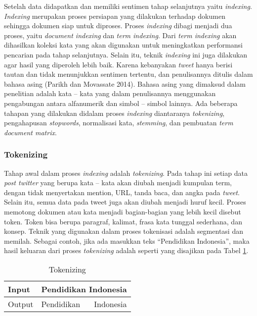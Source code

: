 Setelah data didapatkan dan memiliki sentimen tahap selanjutnya yaitu \textit{indexing}. \textit{Indexing} merupakan proses persiapan yang dilakukan terhadap dokumen sehingga dokumen siap untuk diproses. Proses \textit{indexing} dibagi menjadi dua proses, yaitu \textit{document indexing} dan \textit{term indexing}. Dari \textit{term indexing} akan dihasilkan koleksi kata yang akan digunakan untuk meningkatkan performansi pencarian pada tahap selanjutnya. Selain itu, teknik \textit{indexing} ini juga dilakukan agar hasil yang diperoleh lebih baik. Karena kebanyakan \textit{tweet} hanya berisi tautan dan tidak menunjukkan sentimen tertentu, dan penulisannya ditulis dalam bahasa asing (Parikh dan Movassate 2014). Bahasa asing yang dimaksud dalam penelitian adalah kata – kata yang dalam penulisannya menggunakan pengabungan antara alfanumerik dan simbol – simbol lainnya. Ada beberapa tahapan  yang dilakukan didalam proses \textit{indexing} diantaranya \textit{tokenizing}, pengahapusan \textit{stopwords}, normalisasi kata, \textit{stemming}, dan pembuatan \textit{ term document matrix}.


\subsubsection*{Tokenizing}
Tahap awal dalam proses \textit{indexing} adalah \textit{tokenizing}. Pada tahap ini setiap data \textit{post twitter} yang berupa kata – kata akan diubah menjadi kumpulan term, dengan tidak menyertakan mention, URL, tanda baca, dan angka pada \textit{tweet}. Selain itu, semua data pada tweet juga akan diubah menjadi huruf kecil. Proses memotong dokumen atau kata menjadi bagian-bagian yang lebih kecil disebut token. Token bisa berupa paragraf, kalimat, frasa kata tunggal sederhana, dan konsep. Teknik yang digunakan dalam proses tokenisasi adalah segmentasi dan memilah. Sebagai contoh, jika ada masukkan teks “Pendidikan Indonesia”, maka hasil keluaran dari proses \textit{tokenizing} adalah seperti yang disajikan pada Tabel \ref{tab:tokenizing}.

\begin{table}[hbt]
	\caption{Tokenizing}
	\centering
	\begin{tabular}{llr}
		\toprule
		Input & \multicolumn{2}{c}{Pendidikan Indonesia} \\
		\midrule
		Output & Pendidikan & Indonesia\\
		\bottomrule
	\end{tabular}
	\label{tab:tokenizing}
\end{table}

